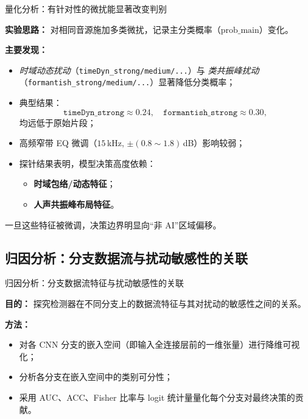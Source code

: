 \documentclass[aspectratio=169]{beamer}
\begin{document}
\begin{frame}{量化分析：有针对性的微扰能显著改变判别}

\textbf{实验思路：}
对相同音源施加多类微扰，记录主分类概率（$\mathrm{prob\_main}$）变化。

\vspace{0.5em}
\textbf{主要发现：}
\begin{itemize}
  \item \emph{时域动态扰动}（\texttt{timeDyn\_strong/medium/...}）与
        \emph{类共振峰扰动}（\texttt{formantish\_strong/medium/...}）显著降低分类概率；
  \item 典型结果：
  \[
    \texttt{timeDyn\_strong} \approx 0.24,\quad
    \texttt{formantish\_strong} \approx 0.30,
  \]
  均远低于原始片段；
  \item 高频窄带 EQ 微调（$15$\,kHz, $\pm(0.8\!\sim\!1.8)$\,dB）影响较弱；
  \item 探针结果表明，模型决策高度依赖：
  \begin{itemize}
    \item \textbf{时域包络/动态特征}；
    \item \textbf{人声共振峰布局特征}。
  \end{itemize}
\end{itemize}

\vspace{0.6em}
一旦这些特征被微调，决策边界明显向“非 AI”区域偏移。
\end{frame}



\subsection{归因分析：分支数据流与扰动敏感性的关联}
\begin{frame}{归因分析：分支数据流特征与扰动敏感性的关联}

\textbf{目的：}  
探究检测器在不同分支上的数据流特征与其对扰动的敏感性之间的关系。

\vspace{0.6em}
\textbf{方法：}
\begin{itemize}
  \item 对各 CNN 分支的嵌入空间（即输入全连接层前的一维张量）进行降维可视化；
  \item 分析各分支在嵌入空间中的类别可分性；
  \item 采用 AUC、ACC、Fisher 比率与 logit 统计量量化每个分支对最终决策的贡献。
\end{itemize}
\end{frame}
\end{document}

